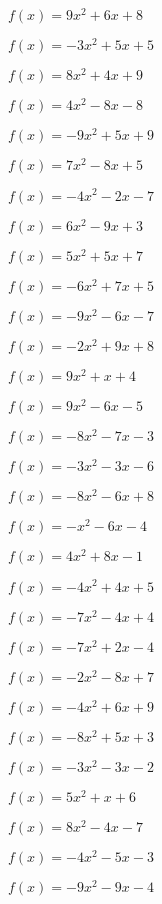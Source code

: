 \item
$\qquad
f(x)=9x^2+6x+8
$
\item
$\qquad
f(x)=-3x^2+5x+5
$
\item
$\qquad
f(x)=8x^2+4x+9
$
\item
$\qquad
f(x)=4x^2-8x-8
$
\item
$\qquad
f(x)=-9x^2+5x+9
$
\item
$\qquad
f(x)=7x^2-8x+5
$
\item
$\qquad
f(x)=-4x^2-2x-7
$
\item
$\qquad
f(x)=6x^2-9x+3
$
\item
$\qquad
f(x)=5x^2+5x+7
$
\item
$\qquad
f(x)=-6x^2+7x+5
$
\item
$\qquad
f(x)=-9x^2-6x-7
$
\item
$\qquad
f(x)=-2x^2+9x+8
$
\item
$\qquad
f(x)=9x^2+x+4
$
\item
$\qquad
f(x)=9x^2-6x-5
$
\item
$\qquad
f(x)=-8x^2-7x-3
$
\item
$\qquad
f(x)=-3x^2-3x-6
$
\item
$\qquad
f(x)=-8x^2-6x+8
$
\item
$\qquad
f(x)=-x^2-6x-4
$
\item
$\qquad
f(x)=4x^2+8x-1
$
\item
$\qquad
f(x)=-4x^2+4x+5
$
\item
$\qquad
f(x)=-7x^2-4x+4
$
\item
$\qquad
f(x)=-7x^2+2x-4
$
\item
$\qquad
f(x)=-2x^2-8x+7
$
\item
$\qquad
f(x)=-4x^2+6x+9
$
\item
$\qquad
f(x)=-8x^2+5x+3
$
\item
$\qquad
f(x)=-3x^2-3x-2
$
\item
$\qquad
f(x)=5x^2+x+6
$
\item
$\qquad
f(x)=8x^2-4x-7
$
\item
$\qquad
f(x)=-4x^2-5x-3
$
\item
$\qquad
f(x)=-9x^2-9x-4
$

